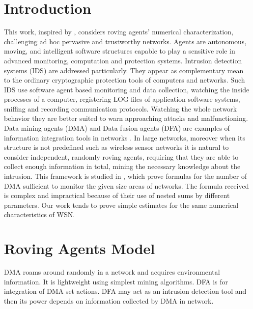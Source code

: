 \documentclass[conference]{IEEEtran}
\begin{document}
\section{Introduction}
This work, inspired by \cite{krugelmobileagent,irarandomagents,brandesnetanalysis}, considers roving agents' numerical characterization, challenging ad hoc pervasive and trustworthy networks. Agents are autonomous, moving, and intelligent software structures capable to play a sensitive role in advanced monitoring, computation and protection systems. Intrusion detection systems (IDS) \cite{krugelmobileagent} are addressed particularly. They appear as complementary mean to the ordinary cryptographic protection tools of computers and networks. Such IDS use software agent based monitoring and data collection, watching the inside processes of a computer, registering LOG files of application software systems, sniffing and recording communication protocols. Watching the whole network behavior they are better suited to warn approaching attacks and malfunctioning. Data mining agents (DMA) and Data fusion agents (DFA) are examples of information integration tools in networks \cite{irarandomagents}. In large networks, moreover when its structure is not predefined such as wireless sensor networks \cite{brandesnetanalysis} it is natural to consider independent, randomly roving agents, requiring that they are able to collect enough information in total, mining the necessary knowledge about the intrusion. This framework is studied in \cite{irarandomagents}, which prove formulas for the number of DMA sufficient to monitor the given size areas of networks. The formula received is complex and impractical because of their use of nested sums by different parameters. Our work tends to prove simple estimates for the same numerical characteristics of WSN.

\section{Roving Agents Model}
DMA roams around randomly in a network and acquires environmental information. It is lightweight using simplest mining algorithms. DFA is for integration of DMA set actions. DFA may act as an intrusion detection tool and then its power depends on information collected by DMA in network.
\end{document}
